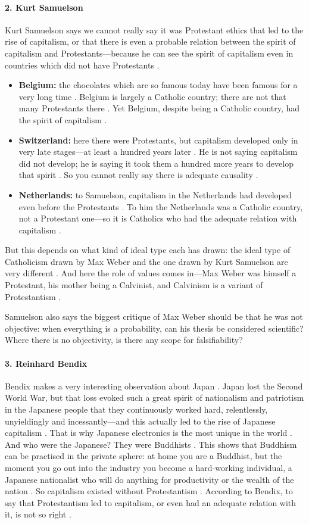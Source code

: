 \paragraph{2. Kurt Samuelson}
Kurt Samuelson says we cannot really say it was Protestant ethics that led to the rise of capitalism, or that there is even a probable relation between the spirit of capitalism and Protestants---because he can see the spirit of capitalism even in countries which did not have Protestants .
\begin{itemize}
    \item \textbf{Belgium:} the chocolates which are so famous today have been famous for a very long time . Belgium is largely a Catholic country; there are not that many Protestants there . Yet Belgium, despite being a Catholic country, had the spirit of capitalism .
    \item \textbf{Switzerland:} here there were Protestants, but capitalism developed only in very late stages---at least a hundred years later . He is not saying capitalism did not develop; he is saying it took them a hundred more years to develop that spirit . So you cannot really say there is adequate causality .
    \item \textbf{Netherlands:} to Samuelson, capitalism in the Netherlands had developed even before the Protestants . To him the Netherlands was a Catholic country, not a Protestant one---so it is Catholics who had the adequate relation with capitalism .
\end{itemize}
But this depends on what kind of ideal type each has drawn: the ideal type of Catholicism drawn by Max Weber and the one drawn by Kurt Samuelson are very different . And here the role of values comes in---Max Weber was himself a Protestant, his mother being a Calvinist, and Calvinism is a variant of Protestantism .

Samuelson also says the biggest critique of Max Weber should be that he was not objective: when everything is a probability, can his thesis be considered scientific? Where there is no objectivity, is there any scope for falsifiability? 

\paragraph{3. Reinhard Bendix}
Bendix makes a very interesting observation about Japan . Japan lost the Second World War, but that loss evoked such a great spirit of nationalism and patriotism in the Japanese people that they continuously worked hard, relentlessly, unyieldingly and incessantly---and this actually led to the rise of Japanese capitalism . That is why Japanese electronics is the most unique in the world .
And who were the Japanese? They were Buddhists . This shows that Buddhism can be practised in the private sphere: at home you are a Buddhist, but the moment you go out into the industry you become a hard-working individual, a Japanese nationalist who will do anything for productivity or the wealth of the nation .
So capitalism existed without Protestantism . According to Bendix, to say that Protestantism led to capitalism, or even had an adequate relation with it, is not so right .

